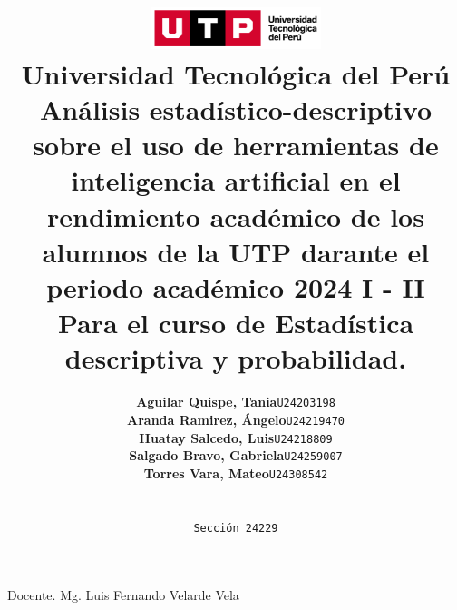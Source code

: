 \documentclass{article}
\title{
  \pagenumbering{gobble}
  \includegraphics[width=5cm]{./assets/logo-utp.png} \\
  \vspace{1cm}
  \textbf{Universidad Tecnológica del Perú} \\
  \vspace{2cm}
  \textbf{Análisis estadístico-descriptivo sobre el uso de herramientas de inteligencia artificial en el rendimiento académico de los alumnos de la UTP darante el periodo académico 2024 I - II} \\
  \vspace{1cm}
  \large \textbf{Para el curso de Estadística descriptiva y probabilidad.}
}
\author{
  \begin{tabular}{ll}
    \textbf{Aguilar Quispe, Tania} & \texttt{U24203198} \\
    \textbf{Aranda Ramirez, Ángelo} & \texttt{U24219470} \\
    \textbf{Huatay Salcedo, Luis} & \texttt{U24218809} \\
    \textbf{Salgado Bravo, Gabriela} & \texttt{U24259007} \\
    \textbf{Torres Vara, Mateo} & \texttt{U24308542} \\
  \end{tabular} \\\\
  \texttt{Sección 24229}
}
\newenvironment{indexPre}{}{}
\begin{document}
\maketitle

\begin{center}

  Docente. Mg. Luis Fernando Velarde Vela

\end{center}

\setcounter{page}{2}   %

\newpage

\begin{indexPre}


\tableofcontents


\end{indexPre}
\end{document}
